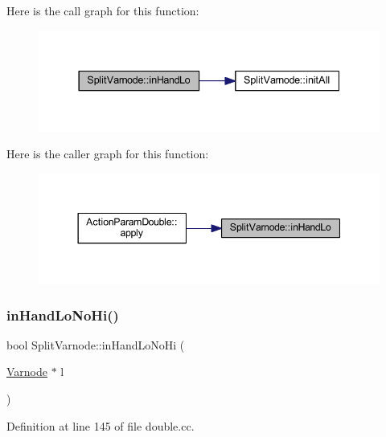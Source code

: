 Here is the call graph for this function\+:
\nopagebreak
\begin{figure}[H]
\begin{center}
\leavevmode
\includegraphics[width=337pt]{class_split_varnode_a7be3658bd83eb37b531a5df3c2e0eb2c_cgraph}
\end{center}
\end{figure}
Here is the caller graph for this function\+:
\nopagebreak
\begin{figure}[H]
\begin{center}
\leavevmode
\includegraphics[width=344pt]{class_split_varnode_a7be3658bd83eb37b531a5df3c2e0eb2c_icgraph}
\end{center}
\end{figure}
\mbox{\label{class_split_varnode_a45771bce187576ac97d128c80c364f39}} 
\subsubsection{\texorpdfstring{inHandLoNoHi()}{inHandLoNoHi()}}
{\footnotesize\ttfamily bool Split\+Varnode\+::in\+Hand\+Lo\+No\+Hi (\begin{DoxyParamCaption}\item[{\mbox{\hyperlink{class_varnode}{Varnode}} $\ast$}]{l }\end{DoxyParamCaption})}



Definition at line 145 of file double.\+cc.

